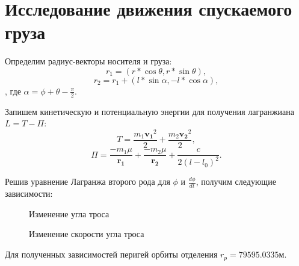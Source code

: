 \section{Исследование движения спускаемого груза}

Определим радиус-векторы носителя и груза:
\begin{equation*}
	r_1 = (r * \cos \theta, r * \sin \theta),
\end{equation*}
\begin{equation*}
	r_2 = r_1 + (l*\sin \alpha, - l * \cos \alpha),
\end{equation*},
где $\alpha=\phi + \theta - \frac{\pi}{2}$.

Запишем кинетическую и потенциальную энергии для получения лагранжиана $L = T - \Pi$:
\begin{equation*}
	T = \frac{m_1 \mathbf{v_1}^2}{2} + \frac{m_2 \mathbf{v_2}^2}{2},
\end{equation*}
\begin{equation*}
	\Pi = \frac{-m_1 \mu}{\mathbf{r_1}} + \frac{-m_2 \mu}{\mathbf{r_2}} + \frac{c}{2 (l-l_0)^2}.
\end{equation*}

Решив уравнение Лагранжа второго рода для $\phi$ и $\frac{d\phi}{dt}$, получим следующие зависимости:
\begin{figure}[H]
	\caption{Изменение угла троса}
\end{figure}
\begin{figure}[H]
	\caption{Изменение скорости угла троса}
\end{figure}

Для полученных зависимостей перигей орбиты отделения $r_p = 79595.0335$м.